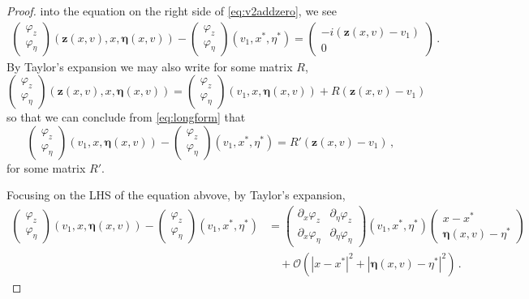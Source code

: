 \documentclass[
	fontsize=11pt, 
	twoside=false, 
	abstract=true, 
	a4paper,
]{scrartcl}
\newcommand{\abs}[1]{\left\lvert#1\right\rvert}
\newcommand{\del}{\partial}
\begin{document}
\begin{proof}
		into the equation on the right side of \cref{eq:v2addzero}, we see
	\begin{align}\label{eq:longform}
		\begin{pmatrix}\varphi_z\\\varphi_\eta\end{pmatrix}(\mathbf{z}(x,v),x,\bm{\eta}(x,v))-\begin{pmatrix}\varphi_z\\\varphi_\eta\end{pmatrix}(v_1,x^\ast,\eta^\ast)  = \begin{pmatrix}-i(\mathbf{z}(x,v)-v_1)\\0\end{pmatrix}\,.
	\end{align}
	By Taylor's expansion we may also write for some matrix $R$,
	\[
		\begin{pmatrix}\varphi_z\\\varphi_\eta\end{pmatrix}(\mathbf{z}(x,v),x,\bm{\eta}(x,v)) = \begin{pmatrix}\varphi_z\\\varphi_\eta\end{pmatrix}(v_1,x,\bm{\eta}(x,v)) + R(\mathbf{z}(x,v)-v_1)
	\]
	so that we can conclude from \cref{eq:longform} that
	\[
		\begin{pmatrix}\varphi_z\\\varphi_\eta\end{pmatrix}(v_1,x,\bm{\eta}(x,v))-\begin{pmatrix}\varphi_z\\\varphi_\eta\end{pmatrix}(v_1,x^\ast,\eta^\ast) = R'(\mathbf{z}(x,v)-v_1)\,,
	\]
	for some matrix $R'$.
	
	Focusing on the LHS of the equation abvove, by Taylor's expansion,
	\begin{equation}\label{eq:matxz}
		\begin{aligned}
			\begin{pmatrix}\varphi_z\\\varphi_\eta\end{pmatrix}(v_1,x,\bm{\eta}(x,v)) - \begin{pmatrix}\varphi_z\\\varphi_\eta\end{pmatrix}(v_1,x^\ast,\eta^\ast) &= \begin{pmatrix}\del_x\varphi_z &\del_\eta\varphi_z\\\del_x\varphi_\eta & \del_\eta\varphi_\eta\end{pmatrix}(v_1,x^\ast,\eta^\ast) \begin{pmatrix} x-x^\ast \\ \bm{\eta}(x,v)-\eta^\ast \end{pmatrix}  \\
			&\quad+ \mathcal{O}(\abs{x-x^\ast}^2+\abs{\bm{\eta}(x,v)-\eta^\ast}^2)\,.
		\end{aligned}
	\end{equation}


\end{proof}
\end{document}
